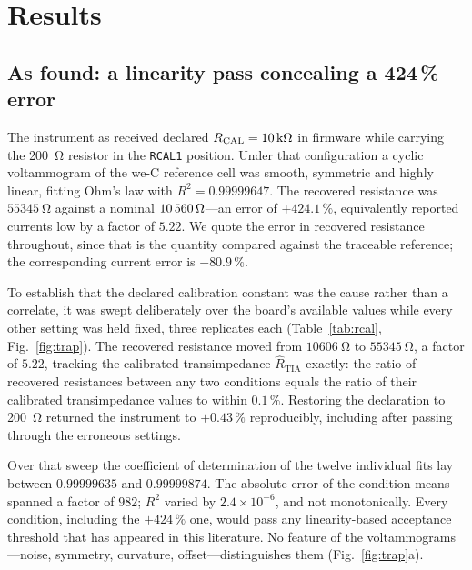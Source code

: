 \section{Results}
\label{sec:results}

\subsection{As found: a linearity pass concealing a 424\,\% error}
\label{sec:trap}

The instrument as received declared $R_{\mathrm{CAL}} = \SI{10}{\kilo\ohm}$ in firmware
while carrying the \SI{200}{\ohm} resistor in the \texttt{RCAL1} position. Under
that configuration a cyclic voltammogram of the we-C reference cell was smooth,
symmetric and highly linear, fitting Ohm's law with $R^2 = 0.99999647$. The
recovered resistance was $\SI{55345}{\ohm}$ against a nominal
$\SI{10560}{\ohm}$---an error of $+424.1\,\%$, equivalently reported currents low by a
factor of $5.22$. We quote the error in recovered resistance throughout, since
that is the quantity compared against the traceable reference; the corresponding
current error is $-80.9\,\%$.

To establish that the declared calibration constant was the cause rather than a
correlate, it was swept deliberately over the board's available values while
every other setting was held fixed, three replicates each
(Table~\ref{tab:rcal}, Fig.~\ref{fig:trap}). The recovered resistance moved from
$\SI{10606}{\ohm}$ to $\SI{55345}{\ohm}$, a factor of $5.22$, tracking the
calibrated transimpedance $\hat{R}_{\mathrm{TIA}}$ exactly: the ratio of
recovered resistances between any two conditions equals the ratio of their
calibrated transimpedance values to within $0.1\,\%$. Restoring the declaration
to \SI{200}{\ohm} returned the instrument to $+0.43\,\%$ reproducibly, including
after passing through the erroneous settings.

Over that sweep the coefficient of determination of the twelve individual fits
lay between $0.99999635$ and $0.99999874$. The absolute error of the condition
means spanned a factor of $982$; $R^2$ varied by $2.4\times10^{-6}$, and not
monotonically. Every condition,
including the $+424\,\%$ one, would pass any linearity-based acceptance
threshold that has appeared in this literature. No feature of the
voltammograms---noise, symmetry, curvature, offset---distinguishes them
(Fig.~\ref{fig:trap}a).

